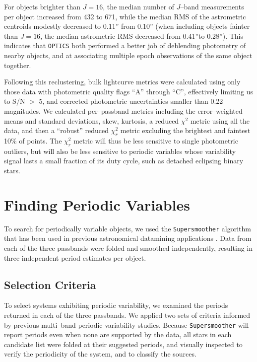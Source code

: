 \documentclass[]{emulateapj}
\begin{document}
For objects brighter than $J=16$, the median number of $J$--band
measurements per object increased from 432 to 671, while the median
RMS of the astrometric centroids modestly decreased to 0.11'' from
0.10'' (when including objects fainter than $J=16$, the median
astrometric RMS decreased from 0.41''to 0.28'').  This indicates that
{\tt OPTICS} both performed a better job of deblending photometry of
nearby objects, and at associating multiple epoch observations of the
same object together.


Following this reclustering, bulk lightcurve metrics were calculated using only
those data with photometric quality flags ``A'' through ``C'',
effectively limiting us to S/N $>$ 5, and corrected photometric
uncertainties smaller than 0.22 magnitudes.  We calculated
per--passband metrics including the error--weighted means and standard
deviations, skew, kurtosis, a reduced $\chi^2$ metric using all the
data, and then a ``robust'' reduced $\chi^2_r$ metric excluding the
brightest and faintest 10\% of points.  The $\chi^2_r$ metric will
thus be less sensitive to single photometric outliers, but will also
be less sensitive to periodic variables whose variability signal lasts
a small fraction of its duty cycle, such as detached eclipsing binary
stars.






\section{Finding Periodic Variables}

To search for periodically variable objects, we used the {\tt Supersmoother} 
algorithm \citep{supersmoother} that has been used in previous astronomical
datamining applications \citep[e.g.][]{becker2011}.  Data
from each of the three passbands were folded and smoothed independently,
resulting in three independent period estimates per object.


\subsection{Selection Criteria}
To select systems exhibiting periodic variability, we examined the
periods returned in each of the three passbands.  We applied two sets
of criteria informed by previous multi--band periodic variability
studies.  Because {\tt Supersmoother} will report periods even when
none are supported by the data, all stars in each candidate list were
folded at their suggested periods, and visually inspected to verify
the periodicity of the system, and to classify the sources.
\end{document}
